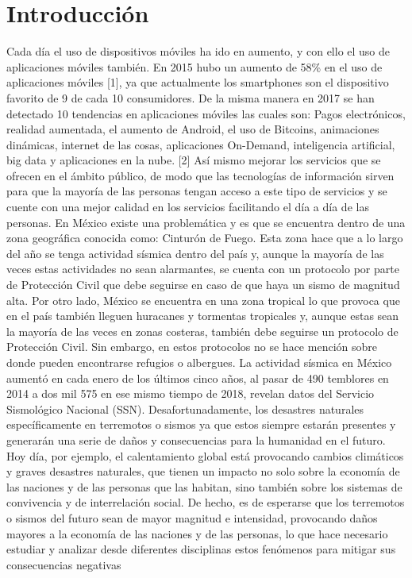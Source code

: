 \section{Introducción}
Cada día el uso de dispositivos móviles ha ido en aumento, y con ello el uso de aplicaciones móviles también. En 2015 hubo un aumento de 58\% en el uso de aplicaciones móviles [1], ya que actualmente los smartphones son el dispositivo favorito de 9 de cada 10 consumidores. De la misma manera en 2017 se han detectado 10 tendencias en aplicaciones móviles las cuales son: Pagos electrónicos, realidad aumentada, el aumento de Android, el uso de Bitcoins, animaciones dinámicas, internet de las cosas, aplicaciones On-Demand, inteligencia artificial, big data y aplicaciones en la nube. [2]
Así mismo mejorar los servicios que se ofrecen en el ámbito público, de modo que las tecnologías de información sirven para que la mayoría de las personas tengan acceso a este tipo de servicios y se cuente con una mejor calidad en los servicios facilitando el día a día de las personas.
En México existe una problemática y es que se encuentra dentro de una zona geográfica conocida como: Cinturón de Fuego. Esta zona hace que a lo largo del año se tenga actividad sísmica dentro del país y, aunque la mayoría de las veces estas actividades no sean alarmantes, se cuenta con un protocolo por parte de Protección Civil que debe seguirse en caso de que haya un sismo de magnitud alta. Por otro lado, México se encuentra en una zona tropical lo que provoca que en el país también lleguen huracanes y tormentas tropicales y, aunque estas sean la mayoría de las veces en zonas costeras, también debe seguirse un protocolo de Protección Civil. Sin embargo, en estos protocolos no se hace mención sobre donde pueden encontrarse refugios o albergues.
La actividad sísmica en México aumentó en cada enero de los últimos cinco años, al pasar de 490 temblores en 2014 a dos mil 575 en ese mismo tiempo de 2018, revelan datos del Servicio Sismológico Nacional (SSN).
Desafortunadamente, los desastres naturales específicamente en terremotos o sismos ya que estos siempre estarán presentes y generarán una serie de daños y consecuencias para la humanidad en el futuro. Hoy día, por ejemplo, el calentamiento global está provocando cambios climáticos y graves desastres naturales, que tienen un impacto no solo sobre la economía de las naciones y de las personas que las habitan, sino también sobre los sistemas de convivencia y de interrelación social. 
De hecho, es de esperarse que los terremotos o sismos del futuro sean de mayor magnitud e intensidad, provocando daños mayores a la economía de las naciones y de las personas, lo que hace necesario estudiar y analizar desde diferentes disciplinas estos fenómenos para mitigar sus consecuencias negativas 

